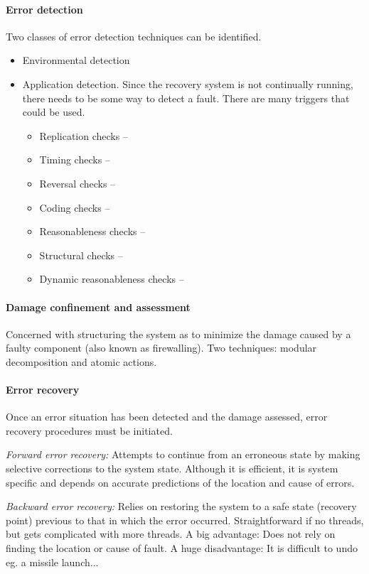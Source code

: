 \paragraph{Error detection} Two classes of error detection techniques can be identified.
\begin{itemize}[nolistsep,noitemsep]
  \item Environmental detection
  \item Application detection. Since the recovery system is not continually running, there needs to be some way to detect a fault. There are many triggers that could be used.
  \begin{itemize}[nolistsep,noitemsep]
    \item Replication checks --
    \item Timing checks --
    \item Reversal checks --
    \item Coding checks --
    \item Reasonableness checks --
    \item Structural checks --
    \item Dynamic reasonableness checks --
  \end{itemize}
\end{itemize}

\paragraph{Damage confinement and assessment} Concerned with structuring the system as to minimize the damage caused by a faulty component (also known as firewalling). Two techniques: modular decomposition and atomic actions.

\paragraph{Error recovery} Once an error situation has been detected and the damage assessed, error recovery procedures must be initiated.

\textit{Forward error recovery:} Attempts to continue from an erroneous state by making selective corrections to the system state. Although it is efficient, it is system specific and depends on accurate predictions of the location and cause of errors.

\textit{Backward error recovery:} Relies on restoring the system to a safe state (recovery point) previous to that in which the error occurred. Straightforward if no threads, but gets complicated with more threads. A big advantage: Does not rely on finding the location or cause of fault. A huge disadvantage: It is difficult to undo eg. a missile launch...

